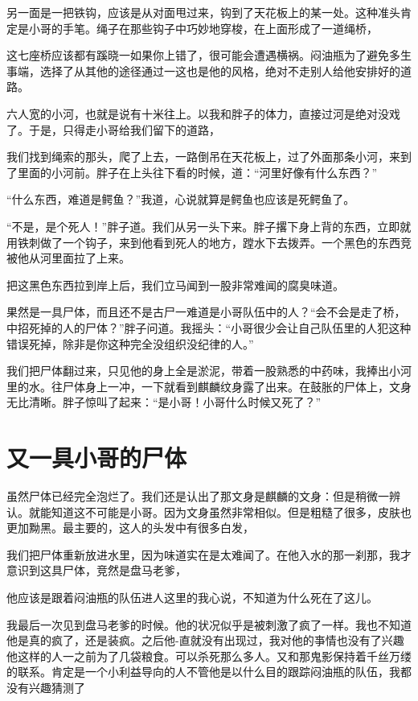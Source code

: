 另一面是一把铁钩，应该是从对面甩过来，钩到了天花板上的某一处。这种准头肯定是小哥的手笔。绳子在那些钩子中巧妙地穿梭，在上面形成了一道绳桥，

这七座桥应该都有蹊晓一如果你上错了，很可能会遭遇横祸。闷油瓶为了避免多生事端，选择了从其他的途径通过一这也是他的风格，绝对不走别人给他安排好的道路。

六人宽的小河，也就是说有十米往上。以我和胖子的体力，直接过河是绝对没戏了。于是，只得走小哥给我们留下的道路，

我们找到绳索的那头，爬了上去，一路倒吊在天花板上，过了外面那条小河，来到了里面的小河前。胖子在上头往下看的时候，道：“河里好像有什么东西？”

“什么东西，难道是鳄鱼？”我道，心说就算是鳄鱼也应该是死鳄鱼了。

“不是，是个死人！”胖子道。我们从另一头下来。胖子撂下身上背的东西，立即就用铁刺做了一个钩子，来到他看到死人的地方，蹚水下去拨弄。一个黑色的东西竞被他从河里面拉了上来。

把这黑色东西拉到岸上后，我们立马闻到一股非常难闻的腐臭味道。

果然是一具尸体，而且还不是古尸一难道是小哥队伍中的人？“会不会是走了桥，中招死掉的人的尸体？”胖子问道。我摇头：“小哥很少会让自己队伍里的人犯这种错误死掉，除非是你这种完全没组织没纪律的人。”

我们把尸体翻过来，只见他的身上全是淤泥，带着一股熟悉的中药味，我捧出小河里的水。往尸体身上一冲，一下就看到麒麟纹身露了出来。在鼓胀的尸体上，文身无比清晰。胖子惊叫了起来：“是小哥！小哥什么时候又死了？”

\chapter{又一具小哥的尸体}

虽然尸体已经完全泡烂了。我们还是认出了那文身是麒麟的文身：但是稍微一辨认。就能知道这不可能是小哥。因为文身虽然非常相似。但是粗糙了很多，皮肤也更加黝黑。最主要的，这人的头发中有很多白发，

我们把尸体重新放进水里，因为味道实在是太难闻了。在他入水的那一刹那，我才意识到这具尸体，竞然是盘马老爹，

他应该是跟着闷油瓶的队伍进人这里的我心说，不知道为什么死在了这儿。

我最后一次见到盘马老爹的时候。他的状况似乎是被刺激了疯了一样。我也不知道他是真的疯了，还是装疯。之后他-直就没有出现过，我对他的亊情也没有了兴趣他这样的人一之前为了几袋粮食。可以杀死那么多人。又和那鬼影保持着千丝万缕的联系。肯定是一个小利益导向的人不管他是以什么目的跟踪闷油瓶的队伍，我都没有兴趣猜测了

